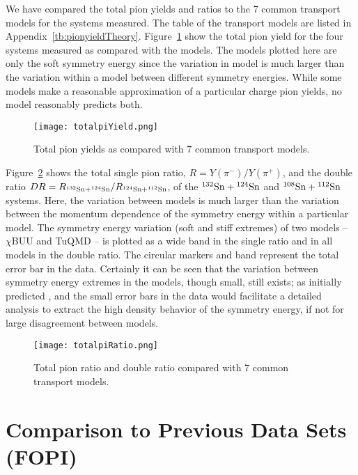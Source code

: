 We have compared the total pion yields and ratios to the 7 common transport models for the systems measured. The table of the transport models are listed in Appendix~\ref{tb:pionyieldTheory}. Figure~\ref{fig:totalpiYield} show the total pion yield for the four systems measured as compared with the models. The models plotted here are only the soft symmetry energy since the variation in model is much larger than the variation within a model between different symmetry energies. While some models make a reasonable approximation of a particular charge pion yields, no model reasonably predicts both. 

\begin{figure}[!htb]
\centering
\texttt{[image: totalpiYield.png]}
\caption{Total pion yields as compared with 7 common transport models.}
\label{fig:totalpiYield}
\end{figure}

Figure~\ref{fig:totalpiRatio} shows the total single pion ratio, $R = Y(\pi^-)/Y(\pi^+)$, and the double ratio  $DR = R_{{}^{132}\mathrm{Sn} + {}^{124}\mathrm{Sn}}/R_{{}^{124}\mathrm{Sn} + {}^{112}\mathrm{Sn}}$, of the ${}^{132}\mathrm{Sn} + {}^{124}\mathrm{Sn}$ and ${}^{108}\mathrm{Sn} + {}^{112}\mathrm{Sn}$ systems. Here, the variation between models is much larger than the variation between the momentum dependence of the symmetry energy within a particular model. The symmetry energy variation (soft and stiff extremes) of two models -- $\chi$BUU and TuQMD -- is plotted as a wide band in the single ratio and in all models in the double ratio. The circular markers and band represent the total error bar in the data. Certainly it can be seen that the variation between symmetry energy extremes in the models, though small, still exists; as initially predicted \cite{baoan_piprod1,baoan_piprod2}, and the small error bars in the data would facilitate a detailed analysis to extract the high density behavior of the symmetry energy, if not for large disagreement between models. 



\begin{figure}[!htb]
\centering
\texttt{[image: totalpiRatio.png]}
\caption{Total pion ratio and double ratio compared with 7 common transport models.}
\label{fig:totalpiRatio}
\end{figure}




\section{Comparison to Previous Data Sets (FOPI)}


